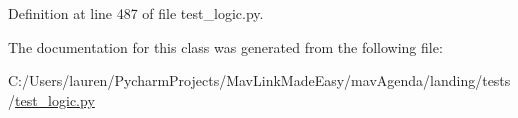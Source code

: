 Definition at line 487 of file test\+\_\+logic.\+py.



The documentation for this class was generated from the following file\+:\begin{DoxyCompactItemize}
\item 
C\+:/\+Users/lauren/\+Pycharm\+Projects/\+Mav\+Link\+Made\+Easy/mav\+Agenda/landing/tests/\mbox{\hyperlink{test__logic_8py}{test\+\_\+logic.\+py}}\end{DoxyCompactItemize}
